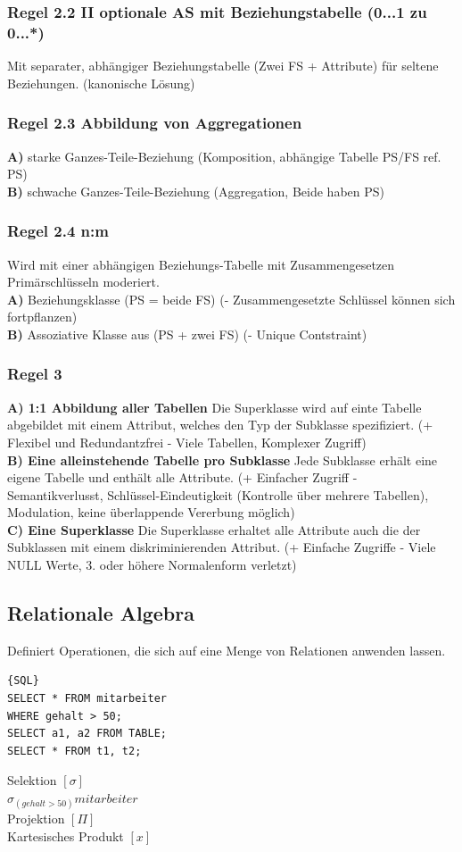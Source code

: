 \documentclass[7pt,landscape,a4paper]{scrartcl}
\begin{document}
\begin{multicols*}{4}
\subsubsection{Regel 2.2 II optionale AS mit Beziehungstabelle (0...1 zu 0...*)}
Mit separater, abhängiger Beziehungstabelle (Zwei FS + Attribute) für seltene Beziehungen. (kanonische Lösung)
\subsubsection{Regel 2.3 Abbildung von Aggregationen}
\textbf{A)} starke Ganzes-Teile-Beziehung (Komposition, abhängige Tabelle PS/FS ref. PS)\\
\textbf{B)} schwache Ganzes-Teile-Beziehung (Aggregation, Beide haben PS)
\subsubsection{Regel 2.4 n:m}
Wird mit einer abhängigen Beziehungs-Tabelle mit Zusammengesetzen Primärschlüsseln moderiert. \\
\textbf{A)} Beziehungsklasse (PS = beide FS) (- Zusammengesetzte Schlüssel können sich fortpflanzen)\\
\textbf{B)} Assoziative Klasse aus (PS + zwei FS) (- Unique Contstraint)
\subsubsection{Regel 3}
\textbf{A) 1:1 Abbildung aller Tabellen} Die Superklasse wird auf einte Tabelle abgebildet mit einem Attribut, welches den Typ der Subklasse spezifiziert. (+ Flexibel und Redundantzfrei - Viele Tabellen, Komplexer Zugriff)\\
\textbf{B) Eine alleinstehende Tabelle pro Subklasse}
 Jede Subklasse erhält eine eigene Tabelle und enthält alle Attribute. (+ Einfacher Zugriff - Semantikverlusst, Schlüssel-Eindeutigkeit (Kontrolle über mehrere Tabellen), Modulation, keine überlappende Vererbung möglich)\\
\textbf{C) Eine Superklasse}
Die Superklasse erhaltet alle Attribute auch die der Subklassen mit einem diskriminierenden Attribut. (+ Einfache Zugriffe - Viele NULL Werte, 3. oder höhere Normalenform verletzt)
\subsection{Relationale Algebra}
Definiert Operationen, die sich auf eine Menge von Relationen anwenden lassen.\\
\begin{minipage}[b]{0,5\linewidth}
\begin{lstlisting}{SQL}
SELECT * FROM mitarbeiter
WHERE gehalt > 50;
SELECT a1, a2 FROM TABLE;
SELECT * FROM t1, t2;
\end{lstlisting}
\end{minipage}
\begin{minipage}[b]{0,5\linewidth}
Selektion $[\sigma]$\\
$\sigma_{(gehalt>50)}mitarbeiter$\\
Projektion $[\Pi]$\\
Kartesisches Produkt $[x]$
\end{minipage}

\end{multicols*}
\end{document}
